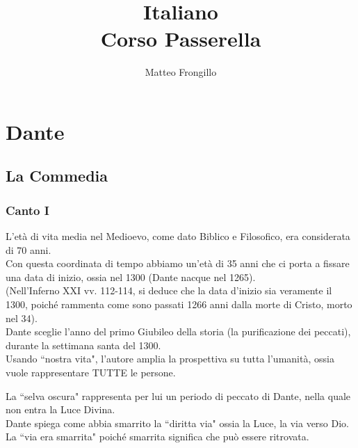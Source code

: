 \documentclass{article}
\title{\textbf{Italiano\\Corso Passerella}}
\author{Matteo Frongillo}
\begin{document}
\maketitle
\tableofcontents

\newpage
\section{Dante}

\subsection{La Commedia}

\subsubsection{Canto I}


L'età di vita media nel Medioevo, come dato Biblico e Filosofico, era considerata di 70 anni.\\
Con questa coordinata di tempo abbiamo un'età di 35 anni che ci porta a fissare una data di inizio, ossia nel 1300 (Dante nacque nel 1265).\\
(Nell'Inferno XXI vv. 112-114, si deduce che la data d'inizio sia veramente il 1300, poiché rammenta come sono passati 1266 anni dalla morte di Cristo, morto nel 34).\\
Dante sceglie l'anno del primo Giubileo della storia (la purificazione dei peccati), durante la settimana santa del 1300.\\
Usando ``nostra vita", l'autore amplia la prospettiva su tutta l'umanità, ossia vuole rappresentare TUTTE le persone.


La ``selva oscura" rappresenta per lui un periodo di peccato di Dante, nella quale non entra la Luce Divina.\\
Dante spiega come abbia smarrito la ``diritta via" ossia la Luce, la via verso Dio.\\
La ``via era smarrita" poiché smarrita significa che può essere ritrovata.

\end{document}
